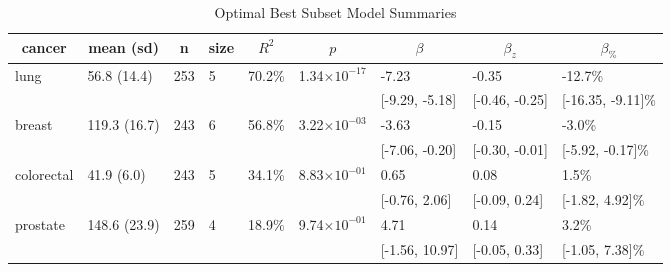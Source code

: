 \begin{table}[!tbp]
\caption{Optimal Best Subset Model Summaries\label{tab:best-subset}} 
\begin{center}
\begin{tabular}{lllllllll}
\hline\hline
\multicolumn{1}{c}{cancer}&\multicolumn{1}{c}{mean (sd)}&\multicolumn{1}{c}{n}&\multicolumn{1}{c}{size}&\multicolumn{1}{c}{$R^2$}&\multicolumn{1}{c}{$p$}&\multicolumn{1}{c}{$\beta$}&\multicolumn{1}{c}{$\beta_z$}&\multicolumn{1}{c}{$\beta_{\%}$}\tabularnewline
\hline
lung&56.8 (14.4)&253&5&70.2\%&1.34$\times10^{-17}$&-7.23&-0.35&-12.7\%\tabularnewline
&&&&&&[-9.29, -5.18]&[-0.46, -0.25]&[-16.35, -9.11]\%\tabularnewline
breast&119.3 (16.7)&243&6&56.8\%&3.22$\times10^{-03}$&-3.63&-0.15&-3.0\%\tabularnewline
&&&&&&[-7.06, -0.20]&[-0.30, -0.01]&[-5.92, -0.17]\%\tabularnewline
colorectal&41.9 (6.0)&243&5&34.1\%&8.83$\times10^{-01}$&0.65&0.08&1.5\%\tabularnewline
&&&&&&[-0.76, 2.06]&[-0.09, 0.24]&[-1.82, 4.92]\%\tabularnewline
prostate&148.6 (23.9)&259&4&18.9\%&9.74$\times10^{-01}$&4.71&0.14&3.2\%\tabularnewline
&&&&&&[-1.56, 10.97]&[-0.05, 0.33]&[-1.05, 7.38]\%\tabularnewline
\hline
\end{tabular}\end{center}

\end{table}
